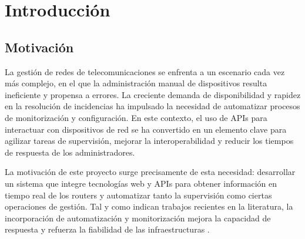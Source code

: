 
\chapter{Introducción}

\section{Motivación}

La gestión de redes de telecomunicaciones se enfrenta a un escenario cada vez más complejo, en el que la administración manual de dispositivos resulta ineficiente y propensa a errores. La creciente demanda de disponibilidad y rapidez en la resolución de incidencias ha impulsado la necesidad de automatizar procesos de monitorización y configuración. En este contexto, el uso de APIs para interactuar con dispositivos de red se ha convertido en un elemento clave para agilizar tareas de supervisión, mejorar la interoperabilidad y reducir los tiempos de respuesta de los administradores.

La motivación de este proyecto surge precisamente de esta necesidad: desarrollar un sistema que integre tecnologías web y APIs para obtener información en tiempo real de los routers y automatizar tanto la supervisión como ciertas operaciones de gestión. Tal y como indican trabajos recientes en la literatura, la incorporación de automatización y monitorización mejora la capacidad de respuesta y refuerza la fiabilidad de las infraestructuras \citep{Schummer2024}.